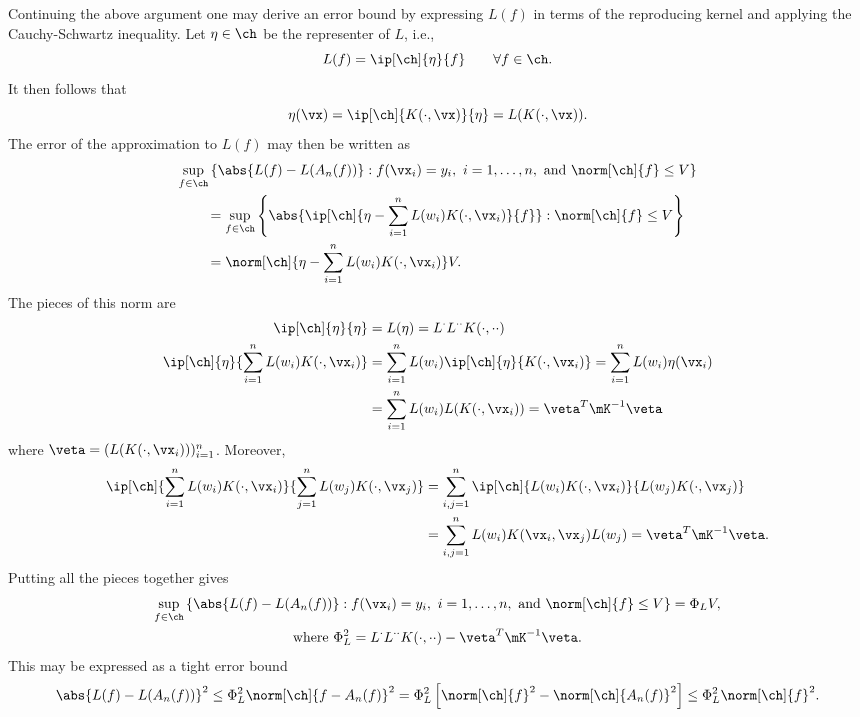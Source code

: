 \documentclass[11pt]{amsart}
\theoremstyle{definition}
\begin{document}
Continuing the above argument one may derive an error bound by expressing $L(f)$ in terms of the reproducing kernel and applying the Cauchy-Schwartz inequality.  Let $\eta \in \ch$ be the representer of $L$, i.e.,
\[
L(f)=\ip[\ch]{\eta}{f} \qquad \forall f \in \ch.
\]
It then follows that
\[
\eta(\vx) = \ip[\ch]{K(\cdot, \vx)}{\eta} = L(K(\cdot,\vx)).
\]
The error of the approximation to $L(f)$ may then be written as
\begin{align*}
\MoveEqLeft{\sup_{f \in \ch } \left \{ \abs{L(f) - L(A_n(f))} : f(\vx_i) = y_i,\ i=1, \ldots, n, \text{ and } \norm[\ch]{f} \le V \right \}}\\
&= \sup_{f \in \ch } \left\{ \abs{\ip[\ch]{\eta - \sum_{i=1}^n L(w_i) K(\cdot,\vx_i)} {f} }:  \norm[\ch]{f} \le V \right\}\\
&=  \norm[\ch]{\eta - \sum_{i=1}^n L(w_i) K(\cdot,\vx_i)}V.
\end{align*}
The pieces of this norm are
\begin{align*}
\ip[\ch]{\eta}{\eta}&= L(\eta)= L^{\cdot}L^{\cdot \cdot} K(\cdot,\cdot\cdot)\\
\ip[\ch]{\eta}{\sum_{i=1}^n L(w_i) K(\cdot,\vx_i)} & = \sum_{i=1}^n L(w_i) \ip[\ch]{\eta} {K(\cdot,\vx_i)} = \sum_{i=1}^n L(w_i) \eta(\vx_i) \\
& = \sum_{i=1}^n L(w_i) L(K(\cdot,\vx_i)) = \veta^T \mK^{-1} \veta
\end{align*}
where $\veta=(L(K(\cdot,\vx_i)))_{i=1}^n$.  Moreover,
\begin{align*}
\ip[\ch]{\sum_{i=1}^n L(w_i) K(\cdot,\vx_i)}{\sum_{j=1}^n L(w_j) K(\cdot,\vx_j)}
&= \sum_{i,j=1}^n \ip[\ch]{L(w_i) K(\cdot,\vx_i)}{L(w_j) K(\cdot,\vx_j)}\\
&= \sum_{i,j=1}^n  L(w_i) K(\vx_i,\vx_j) L(w_j)= \veta^T \mK^{-1} \veta.
\end{align*}
Putting all the pieces together gives
\begin{multline}
\sup_{f \in \ch } \left \{ \abs{L(f) - L(A_n(f))} : f(\vx_i) = y_i,\ i=1, \ldots, n, \text{ and } \norm[\ch]{f} \le V \right \} = \Phi_L V, \\
\text{where } \Phi_L^2 = L^{\cdot}L^{\cdot \cdot} K(\cdot,\cdot\cdot) - \veta^T \mK^{-1} \veta.
\end{multline}
This may be expressed as a tight error bound
\begin{equation} \label{wcerrbd}
 \abs{L(f) - L(A_n(f))}^2 \le \Phi_L^2 \norm[\ch]{f - A_n(f)}^2 =  \Phi_L^2 \left[\norm[\ch]{f}^2 - \norm[\ch]{A_n(f)}^2 \right] \le \Phi_L^2 \norm[\ch]{f}^2.
\end{equation}
\end{document}
